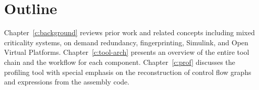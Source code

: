 \section{Outline}
	Chapter~\ref{c:background} reviews prior work and related concepts including mixed criticality systems, on demand redundancy, fingerprinting, Simulink, and Open Virtual Platforms. 
	Chapter~\ref{c:tool-arch} presents an overview of the entire tool chain and the workflow for each component. 
	Chapter~\ref{c:prof} discusses the profiling tool with special emphasis on the reconstruction of control flow graphs and expressions from the assembly code. 
